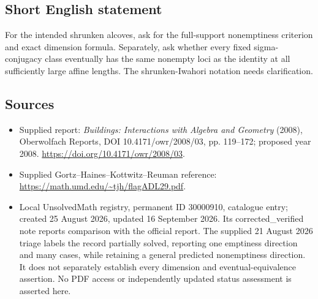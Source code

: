 \documentclass[11pt]{article}
\begin{document}
\subsection{Short English statement}
For the intended shrunken alcoves, ask for the full-support nonemptiness criterion and exact dimension formula. Separately, ask whether every fixed sigma-conjugacy class eventually has the same nonempty loci as the identity at all sufficiently large affine lengths. The shrunken-Iwahori notation needs clarification.
\subsection{Sources}
\begin{itemize}
\item Supplied report: \emph{Buildings: Interactions with Algebra and Geometry} (2008), Oberwolfach Reports, DOI 10.4171/owr/2008/03, pp. 119--172; proposed year 2008. \url{https://doi.org/10.4171/owr/2008/03}.
\item Supplied Gortz--Haines--Kottwitz--Reuman reference: \url{https://math.umd.edu/~tjh/flagADL29.pdf}.
\item Local UnsolvedMath registry, permanent ID 30000910, catalogue entry; created 25 August 2026, updated 16 September 2026. Its corrected\_verified note reports comparison with the official report. The supplied 21 August 2026 triage labels the record partially solved, reporting one emptiness direction and many cases, while retaining a general predicted nonemptiness direction. It does not separately establish every dimension and eventual-equivalence assertion. No PDF access or independently updated status assessment is asserted here.
\end{itemize}
\end{document}
